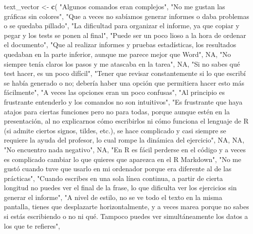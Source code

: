 \documentclass[
]{article}
\newenvironment{Shaded}{\begin{snugshade}}{\end{snugshade}}
\newcommand{\ConstantTok}[1]{\textcolor[rgb]{0.56,0.35,0.01}{#1}}
\newcommand{\FunctionTok}[1]{\textcolor[rgb]{0.13,0.29,0.53}{\textbf{#1}}}
\newcommand{\NormalTok}[1]{#1}
\newcommand{\OtherTok}[1]{\textcolor[rgb]{0.56,0.35,0.01}{#1}}
\newcommand{\StringTok}[1]{\textcolor[rgb]{0.31,0.60,0.02}{#1}}
\begin{document}
\begin{Shaded}
\begin{Highlighting}[]
\NormalTok{text\_vector }\OtherTok{\textless{}{-}} \FunctionTok{c}\NormalTok{(}
  \StringTok{"Algunos comandos eran complejos"}\NormalTok{,}
  \StringTok{"No me gustan las gráficas sin colores"}\NormalTok{,}
  \StringTok{"Que a veces no sabíamos generar informes o daba problemas o se quedaba pillado"}\NormalTok{,}
  \StringTok{"La dificultad para organizar el informe, ya que copiar y pegar y los tests se ponen al final"}\NormalTok{,}
  \StringTok{"Puede ser un poco lioso a la hora de ordenar el documento"}\NormalTok{,}
  \StringTok{"Que al realizar informes y pruebas estadísticas, los resultados quedaban en la parte inferior, aunque me parece mejor que Word"}\NormalTok{,}
  \ConstantTok{NA}\NormalTok{,}
  \StringTok{"No siempre tenía claros los pasos y me atascaba en la tarea"}\NormalTok{,}
  \ConstantTok{NA}\NormalTok{,}
  \StringTok{"Si no sabes qué test hacer, es un poco difícil"}\NormalTok{,}
  \StringTok{"Tener que revisar constantemente si lo que escribí se había generado o no; debería haber una opción que permitiera hacer esto más fácilmente"}\NormalTok{,}
  \StringTok{"A veces las opciones eran un poco confusas"}\NormalTok{,}
  \StringTok{"Al principio es frustrante entenderlo y los comandos no son intuitivos"}\NormalTok{,}
  \StringTok{"Es frustrante que haya atajos para ciertas funciones pero no para todas, porque aunque estén en la presentación, al no explicarnos cómo escribirlos ni cómo funciona el lenguaje de R (si admite ciertos signos, tildes, etc.), se hace complicado y casi siempre se requiere la ayuda del profesor, lo cual rompe la dinámica del ejercicio"}\NormalTok{,}
  \ConstantTok{NA}\NormalTok{,}
  \ConstantTok{NA}\NormalTok{,}
  \StringTok{"No encuentro nada negativo"}\NormalTok{,}
  \ConstantTok{NA}\NormalTok{,}
  \StringTok{"En R es fácil perderse en el código y a veces es complicado cambiar lo que quieres que aparezca en el R Markdown"}\NormalTok{,}
  \StringTok{"No me gustó cuando tuve que usarlo en mi ordenador porque era diferente al de las prácticas"}\NormalTok{,}
  \StringTok{"Cuando escribes en una sola línea continua, a partir de cierta longitud no puedes ver el final de la frase, lo que dificulta ver los ejercicios sin generar el informe"}\NormalTok{,}
  \StringTok{"A nivel de estilo, no se ve todo el texto en la misma pantalla, tienes que desplazarte horizontalmente, y a veces marea porque no sabes si estás escribiendo o no ni qué. Tampoco puedes ver simultáneamente los datos a los que te refieres"}\NormalTok{,}

\end{Highlighting}
\end{Shaded}
\end{document}
